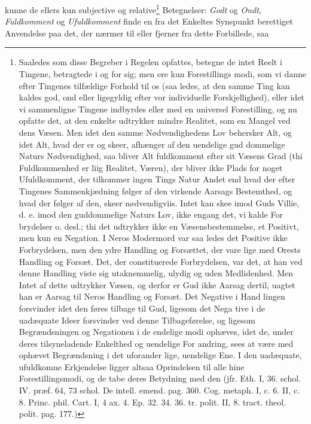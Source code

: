 \documentclass[12pt,a4paper]{book}
\newcommand{\opage}[1]{\marginnote{\footnotesize\textit{[#1]}}}
\begin{document}
kunne de ellers kun subjective og relative\footnote{Saaledes som disse Begreber i Regelen opfattes, betegne de intet
Reelt i Tingene, betragtede i og for sig; men ere kun Forestillings\-%
modi, som vi danne efter Tingenes tilfældige Forhold til os (saa\-%
ledes, at den samme Ting kan kaldes god, ond eller ligegyldig efter
vor individuelle Forskjellighed), eller idet vi sammenligne Tingene
indbyrdes eller med en universel Forestilling, og nu opfatte det,
at den enkelte udtrykker mindre Realitet, som en Mangel ved dens
Væsen. Men idet den samme Nødvendighedens Lov behersker Alt,
og idet Alt, hvad der er og skeer, afhænger af den uendelige gud\-%
dommelige Naturs Nødvendighed, saa bliver Alt fuldkomment efter
sit Væsens Grad (thi Fuldkommenhed er liig Realitet, Væren), der
bliver ikke Plads for noget Ufuldkomment, der tilkommer ingen
Tings Natur Andet end hvad der efter Tingenes Sammenkjædning
følger af den virkende Aarsags Bestemthed, og hvad der følger af
den, skeer nødvendigviis. Intet kan skee imod Guds Villie, d. e.
imod den guddommelige Naturs Lov, ikke engang det, vi kalde For\-%
brydelser o. desl.; thi det udtrykker ikke en Væsensbestemmelse,
et Positivt, men kun en Negation. I Neros Modermord var saa\-%
ledes det Positive ikke Forbrydelsen, men den ydre Handling og
Forsættet, der vare lige med Orests Handling og Forsæt. Det, der
constituerede Forbrydelsen, var det, at han ved denne Handling
viste sig utaknemmelig, ulydig og uden Medlidenhed. Men Intet af
dette udtrykker Væsen, og derfor er Gud ikke Aarsag dertil, uagtet
han er Aarsag til Neros Handling og Forsæt. Det Negative i Hand\-%
lingen forsvinder idet den føres tilbage til Gud, ligesom det Nega\-%
tive i de uadæquate Ideer forsvinder ved denne Tilbageførelse, og
ligesom Begrændsningen og Negationen i de endelige modi ophæves,
idet de, under deres tilsyneladende Enkelthed og uendelige For\-%
andring, sees at være med ophævet Begrændsning i det uforander\-%
lige, uendelige Ene. I den uadæquate, ufuldkomne Erkjendelse
ligger altsaa Oprindelsen til alle hine Forestillingsmodi, og de tabe
deres Betydning med den (jfr. Eth. I, 36. schol. IV. præf. 64, 73
schol. De intell. emend. pag. 360. Cog. metaph. I, c. 6. II, c. 8.
Princ. phil. Cart. I, 4 ax. 4. Ep. 32. 34. 36. tr. polit. II, 8. tract.
theol. polit. pag. 177.)} Betegnelser:
\opage{124} \setcounter{footnote}{0}%
\emph{Godt} og \emph{Ondt}, \emph{Fuldkomment} og \emph{Ufuldkomment} finde
en fra det Enkeltes Synspunkt berettiget Anvendelse paa
det, der nærmer til eller fjerner fra dette Forbillede, saa\-%
\end{document}
